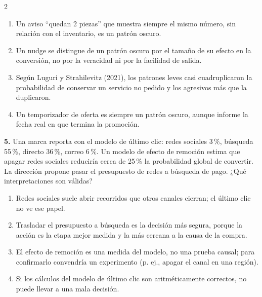 \documentclass[10pt,letterpaper]{article}
\newcommand{\cas}{\framebox[1.0em]{\rule{0pt}{1.05ex}}}
\begin{document}
\begin{multicols}{2}
\begin{minipage}[t]{\columnwidth}
\vspace{1pt}\begin{enumerate}[label=\cas\ \alph*),leftmargin=2.3em,itemsep=1.2pt,topsep=1pt,parsep=0pt,partopsep=0pt]
\item Un aviso \enquote{quedan 2 piezas} que muestra siempre el mismo número, sin relación con el inventario, es un patrón oscuro.
\item Un nudge se distingue de un patrón oscuro por el tamaño de su efecto en la conversión, no por la veracidad ni por la facilidad de salida.
\item Según Luguri y Strahilevitz (2021), los patrones leves casi cuadruplicaron la probabilidad de conservar un servicio no pedido y los agresivos más que la duplicaron.
\item Un temporizador de oferta es siempre un patrón oscuro, aunque informe la fecha real en que termina la promoción.
\end{enumerate}\end{minipage}\par\vspace{3pt}
\begin{minipage}[t]{\columnwidth}\noindent\textbf{5.} Una marca reporta con el modelo de último clic: redes sociales 3\,\%, búsqueda 55\,\%, directo 36\,\%, correo 6\,\%. Un modelo de efecto de remoción estima que apagar redes sociales reduciría cerca de 25\,\% la probabilidad global de convertir. La dirección propone pasar el presupuesto de redes a búsqueda de pago. ¿Qué interpretaciones son válidas?
\vspace{1pt}\begin{enumerate}[label=\cas\ \alph*),leftmargin=2.3em,itemsep=1.2pt,topsep=1pt,parsep=0pt,partopsep=0pt]
\item Redes sociales suele abrir recorridos que otros canales cierran; el último clic no ve ese papel.
\item Trasladar el presupuesto a búsqueda es la decisión más segura, porque la acción es la etapa mejor medida y la más cercana a la causa de la compra.
\item El efecto de remoción es una medida del modelo, no una prueba causal; para confirmarlo convendría un experimento (p. ej., apagar el canal en una región).
\item Si los cálculos del modelo de último clic son aritméticamente correctos, no puede llevar a una mala decisión.
\end{enumerate}\end{minipage}\par\vspace{3pt}

\end{multicols}
\end{document}
